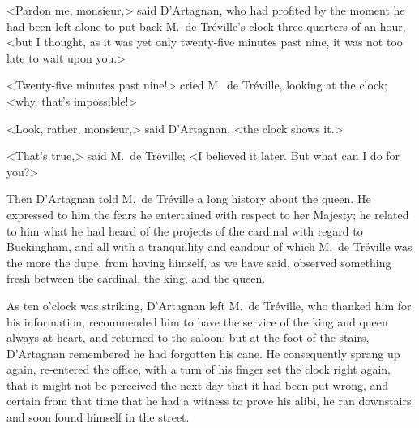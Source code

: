 <Pardon me, monsieur,> said D'Artagnan, who had profited by the moment he had been left alone to put back M.~de Tréville's clock three-quarters of an hour, <but I thought, as it was yet only twenty-five minutes past nine, it was not too late to wait upon you.> 

<Twenty-five minutes past nine!> cried M.~de Tréville, looking at the clock; <why, that's impossible!> 

<Look, rather, monsieur,> said D'Artagnan, <the clock shows it.> 

<That's true,> said M.~de Tréville; <I believed it later. But what can I do for you?> 

Then D'Artagnan told M.~de Tréville a long history about the queen. He expressed to him the fears he entertained with respect to her Majesty; he related to him what he had heard of the projects of the cardinal with regard to Buckingham, and all with a tranquillity and candour of which M.~de Tréville was the more the dupe, from having himself, as we have said, observed something fresh between the cardinal, the king, and the queen. 

As ten o'clock was striking, D'Artagnan left M.~de Tréville, who thanked him for his information, recommended him to have the service of the king and queen always at heart, and returned to the saloon; but at the foot of the stairs, D'Artagnan remembered he had forgotten his cane. He consequently sprang up again, re-entered the office, with a turn of his finger set the clock right again, that it might not be perceived the next day that it had been put wrong, and certain from that time that he had a witness to prove his alibi, he ran downstairs and soon found himself in the street.